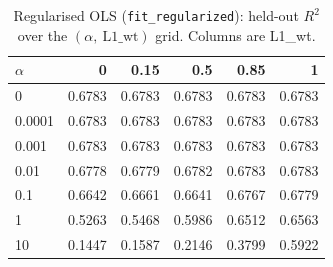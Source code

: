 \begin{table}[htbp]
\centering
\caption{Regularised OLS (\texttt{fit\_regularized}): held-out $R^2$ over the $(\alpha,\ \mathrm{L1\_wt})$ grid. Columns are L1\_wt.}\label{tab:reg-grid}
\begin{tabular}{lrrrrr}
\toprule
$\alpha$ & 0 & 0.15 & 0.5 & 0.85 & 1 \\
\midrule
0 & 0.6783 & 0.6783 & 0.6783 & 0.6783 & 0.6783 \\
0.0001 & 0.6783 & 0.6783 & 0.6783 & 0.6783 & 0.6783 \\
0.001 & 0.6783 & 0.6783 & 0.6783 & 0.6783 & 0.6783 \\
0.01 & 0.6778 & 0.6779 & 0.6782 & 0.6783 & 0.6783 \\
0.1 & 0.6642 & 0.6661 & 0.6641 & 0.6767 & 0.6779 \\
1 & 0.5263 & 0.5468 & 0.5986 & 0.6512 & 0.6563 \\
10 & 0.1447 & 0.1587 & 0.2146 & 0.3799 & 0.5922 \\
\bottomrule
\end{tabular}
\end{table}
